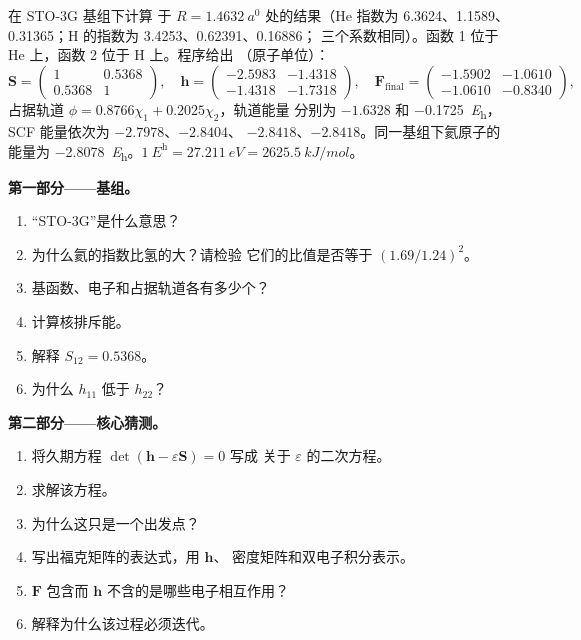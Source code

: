 \begin{problem}
\label{pb:b3:computational-chemistry:1}
在 STO-3G 基组下计算  于 $R = \qty{1.4632}{\bohr}$ 处的结果（He
指数为 6.3624、1.1589、0.31365；H 的指数为 3.4253、0.62391、0.16886；
三个系数相同）。函数 1 位于 He 上，函数 2 位于 H 上。程序给出
（原子单位）：
\[
\mathbf S = \begin{pmatrix}1 & 0.5368\\ 0.5368 & 1\end{pmatrix},\quad
\mathbf h = \begin{pmatrix}-2.5983 & -1.4318\\ -1.4318 & -1.7318\end{pmatrix},\quad
\mathbf F_{\mathrm{final}} = \begin{pmatrix}-1.5902 & -1.0610\\ -1.0610 & -0.8340
\end{pmatrix},
\]
占据轨道 $\phi = 0.8766\chi_1 + 0.2025\chi_2$，轨道能量
分别为 $-1.6328$ 和 \qty{-0.1725}{\hartree}，SCF 能量依次为 $-2.7978$、$-2.8404$、
$-2.8418$、$-2.8418$。同一基组下氦原子的能量为
\qty{-2.8078}{\hartree}。$\qty{1}{\hartree} = \qty{27.211}{eV} =
\qty{2625.5}{kJ/mol}$。

\medskip\noindent\textbf{第一部分——基组。}
\begin{enumerate}
  \item “STO-3G”是什么意思？
  \item 为什么氦的指数比氢的大？请检验
        它们的比值是否等于 $(1.69/1.24)^2$。
  \item 基函数、电子和占据轨道各有多少个？
  \item 计算核排斥能。
  \item 解释 $S_{12} = 0.5368$。
  \item 为什么 $h_{11}$ 低于 $h_{22}$？
\end{enumerate}

\medskip\noindent\textbf{第二部分——核心猜测。}
\begin{enumerate}[resume]
  \item 将久期方程 $\det(\mathbf h - \varepsilon\mathbf S) = 0$ 写成
        关于 $\varepsilon$ 的二次方程。
  \item 求解该方程。
  \item 为什么这只是一个出发点？
  \item 写出福克矩阵的表达式，用 $\mathbf h$、
        密度矩阵和双电子积分表示。
  \item $\mathbf F$ 包含而 $\mathbf h$ 不含的是哪些电子相互作用？
  \item 解释为什么该过程必须迭代。
\end{enumerate}


\end{problem}
